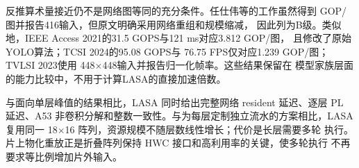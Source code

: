 反推算术量接近仍不是网络图等同的充分条件。任仕伟等的工作虽然得到
\BITGOPPerImage{} GOP/图并报告416输入，但原文明确采用网络重组和规模缩减，
因此列为B级。类似地，IEEE Access 2021的31.5 GOPS与121 ms对应3.812 GOP/图，
且修改了原始YOLO算法\cite{adiono2021lowlatency}；TCSI 2024的95.08 GOPS与
76.75 FPS仅对应1.239 GOP/图\cite{kim2024flexibleyolo}；TVLSI 2023使用
448$\times$448输入并报告归一化帧率\cite{multicoreyolo2023}。这些结果保留在
模型家族层面的能力比较中，不用于计算LASA的直接加速倍数。

与面向单层峰值的结果相比，LASA 同时给出完整网络 resident 延迟、逐层 PL
延迟、A53 非卷积分解和整数一致性。与为每层定制独立流水的方案相比，LASA
复用同一 18$\times$16 阵列，资源规模不随层数线性增长；代价是长层需要多轮
执行。片上物化重放正是折叠阵列保持 HWC 接口和高利用率的关键，使多轮执行
不再要求等比例增加片外输入。

\FloatBarrier
